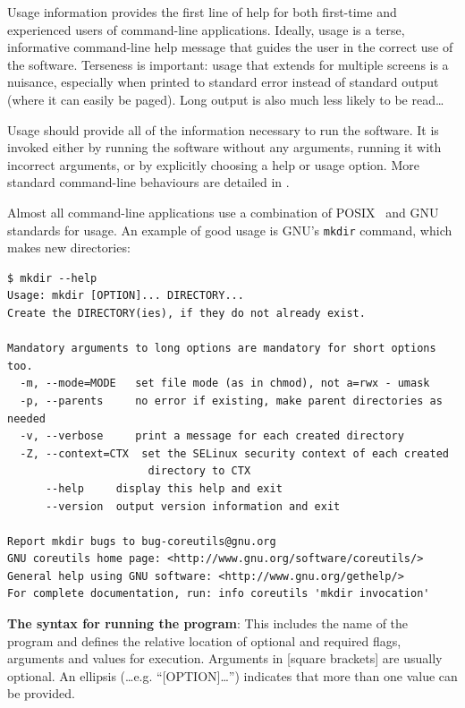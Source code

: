 \documentclass[10pt,letterpaper]{article}
\begin{document}
Usage information provides the first line of help for both first-time and
experienced users of command-line applications.
Ideally, usage is a terse, informative command-line help message that
guides the user in the correct use of the software. Terseness is
important: usage that extends for multiple screens is a nuisance, especially when
printed to standard error instead of standard output (where it can
easily be paged).  Long output is also much less likely to be read{\ldots}

Usage should provide all of the information necessary to run the
software. It is invoked either by running the software without
any arguments, running it with incorrect arguments, or by
explicitly choosing a help or usage option.
More standard command-line behaviours are detailed in \cite{Seemann2013}.

Almost all command-line applications use a combination of
POSIX~\cite{posix2016} and GNU~\cite{gnustandards} standards for usage. 
An example of good usage is GNU's \texttt{mkdir} command, which makes
new directories:

\begin{small}
\begin{verbatim}
$ mkdir --help
Usage: mkdir [OPTION]... DIRECTORY...
Create the DIRECTORY(ies), if they do not already exist.

Mandatory arguments to long options are mandatory for short options too.
  -m, --mode=MODE   set file mode (as in chmod), not a=rwx - umask
  -p, --parents     no error if existing, make parent directories as needed
  -v, --verbose     print a message for each created directory
  -Z, --context=CTX  set the SELinux security context of each created
                      directory to CTX
      --help     display this help and exit
      --version  output version information and exit

Report mkdir bugs to bug-coreutils@gnu.org
GNU coreutils home page: <http://www.gnu.org/software/coreutils/>
General help using GNU software: <http://www.gnu.org/gethelp/>
For complete documentation, run: info coreutils 'mkdir invocation'
\end{verbatim}
\end{small}

\textbf{The syntax for running the program}: This includes the name of the
program and defines the relative
location of optional and required flags, arguments and values for execution.
Arguments in {[}square brackets{]}
are usually optional. An ellipsis (\ldots e.g. ``{[}OPTION{]}\ldots{}'')
indicates that more than one value can be provided.
\end{document}
